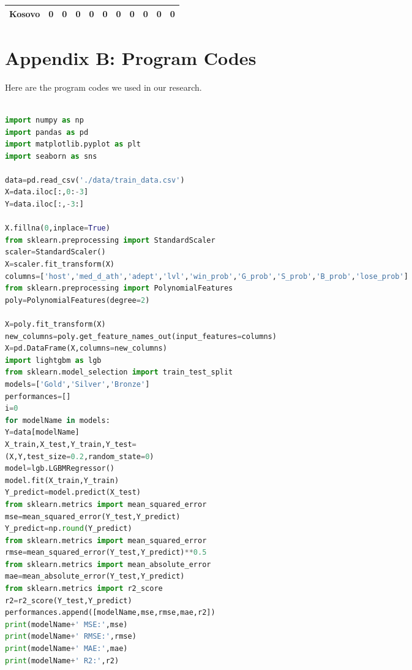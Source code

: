 \documentclass[12pt]{article}  %
\begin{document}
\begin{subappendices}
\begin{longtable}{|l|c|c|c|c|c|c|c|c|c|c|}
	\hline
	Kosovo                                                         & 0                                                                      & 0                                                                      & 0                                                                      & 0                                                                      & 0                                                                      & 0                                                                      & 0                         & 0                           & 0                           & 0                           \\
	\hline
\end{longtable}



\section{Appendix B: Program Codes}
Here are the program codes we used in our research.




\begin{lstlisting}[language=Python, name={LightGBM.py}]

import numpy as np
import pandas as pd
import matplotlib.pyplot as plt
import seaborn as sns

data=pd.read_csv('./data/train_data.csv')
X=data.iloc[:,0:-3]
Y=data.iloc[:,-3:]

X.fillna(0,inplace=True)
from sklearn.preprocessing import StandardScaler
scaler=StandardScaler()
X=scaler.fit_transform(X)
columns=['host','med_d_ath','adept','lvl','win_prob','G_prob','S_prob','B_prob','lose_prob']
from sklearn.preprocessing import PolynomialFeatures
poly=PolynomialFeatures(degree=2)

X=poly.fit_transform(X)
new_columns=poly.get_feature_names_out(input_features=columns)
X=pd.DataFrame(X,columns=new_columns)
import lightgbm as lgb
from sklearn.model_selection import train_test_split
models=['Gold','Silver','Bronze']
performances=[]
i=0
for modelName in models:
Y=data[modelName]
X_train,X_test,Y_train,Y_test=
(X,Y,test_size=0.2,random_state=0)
model=lgb.LGBMRegressor()
model.fit(X_train,Y_train)
Y_predict=model.predict(X_test)
from sklearn.metrics import mean_squared_error
mse=mean_squared_error(Y_test,Y_predict)
Y_predict=np.round(Y_predict)
from sklearn.metrics import mean_squared_error
rmse=mean_squared_error(Y_test,Y_predict)**0.5
from sklearn.metrics import mean_absolute_error
mae=mean_absolute_error(Y_test,Y_predict)
from sklearn.metrics import r2_score
r2=r2_score(Y_test,Y_predict)
performances.append([modelName,mse,rmse,mae,r2])
print(modelName+' MSE:',mse)
print(modelName+' RMSE:',rmse)
print(modelName+' MAE:',mae)
print(modelName+' R2:',r2)


\end{lstlisting}
\end{subappendices}
\end{document}
